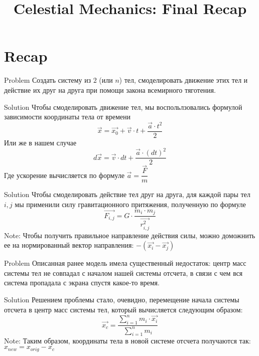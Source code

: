\documentclass{beamer}
\title{Celestial Mechanics: Final Recap}
\begin{document}
\begin{frame}
  \titlepage
\end{frame}

\section{Recap}

\begin{frame}[fragile]{Problem}
  Создать систему из $2$ (или $n$) тел, смоделировать движение этих тел и действие их друг на друга при помощи закона всемирного тяготения.
\end{frame}

\begin{frame}[fragile]{Solution}
  Чтобы смоделировать движение тел, мы воспольлзовались формулой зависимости координаты тела от времени
  \[\overrightarrow{x} = \overrightarrow{x_0} + \overrightarrow{v} \cdot t + \dfrac{\overrightarrow{a} \cdot t^2}{2}\]
  Или же в нашем случае\newline
  \[d\overrightarrow{x} = \overrightarrow{v} \cdot dt + \dfrac{\overrightarrow{a} \cdot (dt)^2}{2}\]
  Где ускорение вычисляется по формуле $\overrightarrow{a} = \dfrac{\overrightarrow{F}}{m}$
\end{frame}

\begin{frame}[fragile]{Solution}
  Чтобы смоделировать действие тел друг на друга, для каждой пары тел $i, j$ мы применили силу гравитационного притяжения,\newline
  полученную по формуле
  \[\overrightarrow{F_{i,j}} = G \cdot \dfrac{m_i \cdot m_j}{\overrightarrow{r_{i,j}^2}}\]
  Note: Чтобы получить правильное направление действия силы, можно доможнить ее на нормированный вектор\newline
  направления: $-(\overrightarrow{x_i} - \overrightarrow{x_j})$
\end{frame}

\begin{frame}[fragile]{Problem}
  Описанная ранее модель имела существенный недостаток: центр масс системы тел не совпадал с началом нашей системы\newline
  отсчета, в связи с чем вся система пропадала с экрана спустя какое-то время.
\end{frame}

\begin{frame}[fragile]{Solution}
  Решением проблемы стало, очевидно, перемещение начала системы отсчета в центр масс системы тел,\newline
  который вычисляется следующим образом:
  \[\overrightarrow{x_c} = \dfrac{\sum_{i = 1}^{n} m_i \cdot \overrightarrow{x_i}}{\sum_{i = 1}^{n} m_i}\]
  Note: Таким образом, координаты тела в новой системе отсчета получаются так: $x_{new} = x_{orig} - x_c$
\end{frame}
\end{document}
